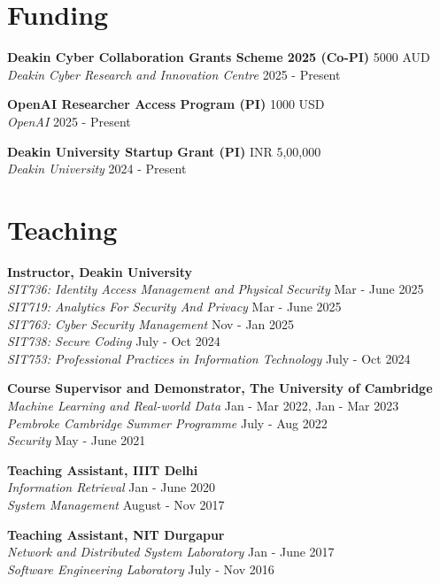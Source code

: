 \documentclass[margin, centered,lmodern]{res}
\begin{document}
\begin{resume}
\section{Funding}
\textbf{Deakin Cyber Collaboration Grants Scheme 2025 (Co-PI)} \hfill 5000 AUD  \\
\emph{Deakin Cyber Research and Innovation Centre} \hfill 2025 - Present

\textbf{OpenAI Researcher Access Program (PI)} \hfill 1000 USD  \\
\emph{OpenAI} \hfill 2025 - Present

\textbf{Deakin University Startup Grant (PI)} \hfill INR 5,00,000  \\
\emph{Deakin University} \hfill 2024 - Present

\section{Teaching}
\textbf{Instructor,  Deakin University} \\
\emph{SIT736: Identity Access Management and Physical Security} \hfill Mar - June 2025 \\
\emph{SIT719: Analytics For Security And Privacy} \hfill Mar - June 2025 \\
\emph{SIT763: Cyber Security Management} \hfill Nov - Jan 2025 \\
\emph{SIT738: Secure Coding} \hfill July - Oct 2024 \\
\emph{SIT753: Professional Practices in Information Technology} \hfill July - Oct 2024 

\textbf{Course Supervisor and Demonstrator, The University of Cambridge} \\
\emph{Machine Learning and Real-world Data} \hfill Jan - Mar 2022, Jan - Mar 2023 \\
\emph{Pembroke Cambridge Summer Programme} \hfill July - Aug 2022 \\
\emph{Security} \hfill May - June 2021 

\textbf{Teaching Assistant, IIIT Delhi} \\
\emph{Information Retrieval} \hfill Jan - June 2020 \\
\emph{System Management} \hfill August - Nov 2017


\textbf{Teaching Assistant, NIT Durgapur} \\
\emph{Network and Distributed System Laboratory} \hfill Jan - June 2017 \\
\emph{Software Engineering Laboratory} \hfill July - Nov 2016


\end{resume}
\end{document}
